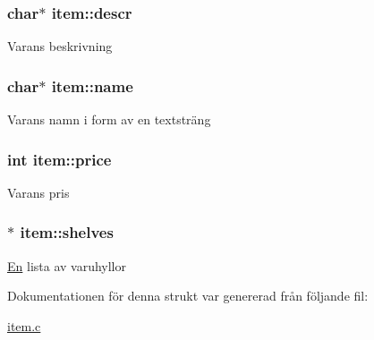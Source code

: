 \subsubsection[{\texorpdfstring{descr}{descr}}]{\setlength{\rightskip}{0pt plus 5cm}char$\ast$ item\+::descr}\hypertarget{structitem_a7486c43d6e783fd7093dc9cee62b518f}{}\label{structitem_a7486c43d6e783fd7093dc9cee62b518f}
Varans beskrivning 
\subsubsection[{\texorpdfstring{name}{name}}]{\setlength{\rightskip}{0pt plus 5cm}char$\ast$ item\+::name}\hypertarget{structitem_adbf6cb817816601a08c614bb77bcf075}{}\label{structitem_adbf6cb817816601a08c614bb77bcf075}
Varans namn i form av en textsträng 
\subsubsection[{\texorpdfstring{price}{price}}]{\setlength{\rightskip}{0pt plus 5cm}int item\+::price}\hypertarget{structitem_a77214da8535815143a7ba318a25c5811}{}\label{structitem_a77214da8535815143a7ba318a25c5811}
Varans pris 
\subsubsection[{\texorpdfstring{shelves}{shelves}}]{$\ast$ item\+::shelves}\hypertarget{structitem_a2c6c18e4202d967e7ff0f4421b72bcdf}{}\label{structitem_a2c6c18e4202d967e7ff0f4421b72bcdf}
\hyperlink{structEn}{En} lista av varuhyllor 

Dokumentationen för denna strukt var genererad från följande fil\+:\begin{DoxyCompactItemize}
\item 
\hyperlink{item_8c}{item.\+c}\end{DoxyCompactItemize}
